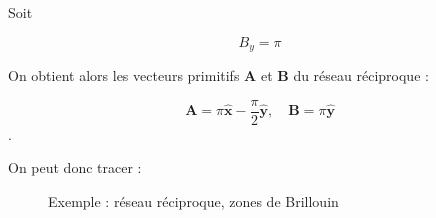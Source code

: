 Soit

\begin{equation*}
B_y = \pi
\end{equation*}

On obtient alors les vecteurs primitifs $\mathbf{A}$ et $\mathbf{B}$ du réseau réciproque :

\begin{equation}
\mathbf{A} = \pi\mathbf{\hat{x}}-\frac{\pi}{2}\mathbf{\hat{y}},\quad \mathbf{B} = \pi \mathbf{\hat{y}}
\end{equation}.

On peut donc tracer :

\begin{figure}
\TODO
\caption{Exemple : réseau réciproque, zones de Brillouin}
\label{fig:exemplebrillouin}
\end{figure}